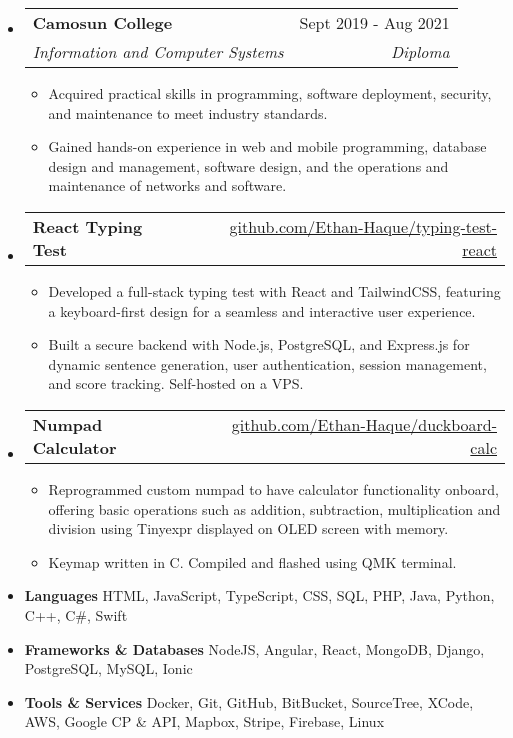 \documentclass[letterpaper,11pt]{article}[leftmargin=*]
\makeatletter
\def \entryspacing {-0pt}
\renewcommand{\section}[2]{\vspace{5pt}
  \tcbox[on line,boxsep=0pt,left=2pt,right=2pt,top=2pt,bottom=2pt,colback=secondary]
  {\color{white}\raggedbottom\normalsize\textbf{{#1}{\hspace{7pt}#2}}}
}
\newcommand{\resumeEntryStart}{\begin{itemize}[leftmargin=2.5mm]}
\newcommand{\resumeEntryEnd}{\end{itemize}\vspace{\entryspacing}}
\newcommand{\resumeItemListStart}{\begin{itemize}[leftmargin=4.5mm]}
\newcommand{\resumeItemListEnd}{\end{itemize}}
\newcommand{\resumeItem}[1]{
  \item\small{
    {#1 \vspace{-2pt}}
  }
}
\newcommand{\resumeEntryTSDL}[4]{
  \vspace{-1pt}\item[]
    \begin{tabularx}{0.97\textwidth}{X@{\hspace{60pt}}r}
      \textbf{\color{primary}#1} & {\firabook\color{accent}\small#2} \\
      \textit{\color{accent}\small#3} & \textit{\color{accent}\small#4} \\
    \end{tabularx}\vspace{-6pt}
}
\newcommand{\resumeEntryTD}[2]{
  \vspace{-1pt}\item[]
    \begin{tabularx}{0.97\textwidth}{X@{\hspace{60pt}}r}
      \textbf{\color{primary}#1} & {\firabook\color{accent}\small#2} \\
    \end{tabularx}\vspace{-6pt}
}
\newcommand{\resumeEntryS}[2]{
  \item[]\small{
    \textbf{\color{primary}#1 }{ #2 \vspace{-6pt}}
  }
}
\makeatother
\begin{document}
\section{\faGraduationCap}{Education}
  \resumeEntryStart
    \resumeEntryTSDL
      {Camosun College}{Sept 2019 - Aug 2021}
      {Information and Computer Systems}{Diploma}
      \resumeItemListStart
      \resumeItem {Acquired practical skills in programming, software deployment, security, and maintenance to meet industry standards.}
      \resumeItem{Gained hands-on experience in web and mobile programming, database design and management, software design, and the operations and maintenance of networks and software.}
      \resumeItemListEnd
  \resumeEntryEnd
  
  
\section{\faFlask}{Projects}

\resumeEntryStart
    \resumeEntryTD
      {React Typing Test}{\href{https://github.com/Ethan-Haque/typing-test-react}{github.com/Ethan-Haque/typing-test-react}}
    \resumeItemListStart
    \resumeItem{Developed a full-stack typing test with React and TailwindCSS, featuring a keyboard-first design for a seamless and interactive user experience.}
    \resumeItem{Built a secure backend with Node.js, PostgreSQL, and Express.js for dynamic sentence generation, user authentication, session management, and score tracking. Self-hosted on a VPS.}
    \resumeItemListEnd
  
    \resumeEntryTD
      {Numpad Calculator}{\href{https://github.com/Ethan-Haque/duckboard-calc}{github.com/Ethan-Haque/duckboard-calc}}
    \resumeItemListStart
      \resumeItem {Reprogrammed custom numpad to have calculator functionality onboard, offering basic operations such as addition, subtraction, multiplication and division using Tinyexpr displayed on OLED screen with memory.}
      \resumeItem {Keymap written in C. Compiled and flashed using QMK terminal.}
    \resumeItemListEnd
  \resumeEntryEnd
\section{\faGears}{Skills}
 \resumeEntryStart
  \resumeEntryS{Languages} {HTML, JavaScript, TypeScript, CSS, SQL, PHP, Java, Python, C++, C\#, Swift}
  \resumeEntryS{Frameworks \& Databases} {NodeJS, Angular, React, MongoDB, Django, PostgreSQL, MySQL, Ionic}
  \resumeEntryS{Tools \& Services} {Docker, Git, GitHub, BitBucket, SourceTree, XCode, AWS, Google CP \& API, Mapbox, Stripe, Firebase, Linux}
 \resumeEntryEnd
\end{document}
